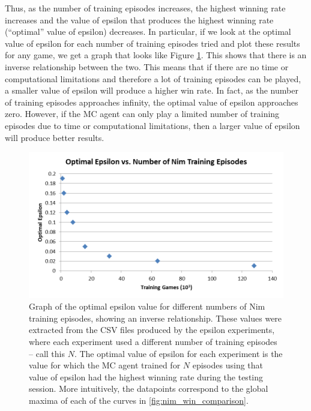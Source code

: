 \documentclass[11pt,a4paper]{report}
\begin{document}
Thus, as the number of training episodes increases, the highest winning rate increases and the value of epsilon that produces the highest winning rate (``optimal'' value of epsilon) decreases. In particular, if we look at the optimal value of epsilon for each number of training episodes tried and plot these results for any game, we get a graph that looks like Figure \ref{nim-training-vs-opt-epsilon}. This shows that there is an inverse relationship between the two. This means that if there are no time or computational limitations and therefore a lot of training episodes can be played, a smaller value of epsilon will produce a higher win rate. In fact, as the number of training episodes approaches infinity, the optimal value of epsilon approaches zero. However, if the MC agent can only play a limited number of training episodes due to time or computational limitations, then a larger value of epsilon will produce better results.

\begin{figure}[htbp]
	\begin{center}
		\includegraphics[width=\linewidth]{Nim_OptimalEpsilon_vs_Training.png}
		\caption{Graph of the optimal epsilon value for different numbers of Nim training episodes, showing an inverse relationship. These values were extracted from the CSV files produced by the epsilon experiments, where each experiment used a different number of training episodes -- call this $N$. The optimal value of epsilon for each experiment is the value for which the MC agent trained for $N$ episodes using that value of epsilon had the highest winning rate during the testing session. More intuitively, the datapoints correspond to the global maxima of each of the curves in \ref{fig:nim_win_comparison}. }
		\label{nim-training-vs-opt-epsilon}
	\end{center}
\end{figure}
\end{document}
